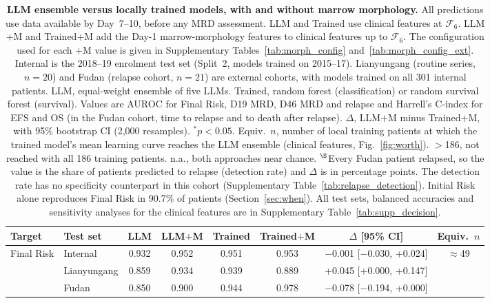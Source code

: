 \documentclass[pdflatex,sn-nature]{sn-jnl}
\begin{document}
\begin{table}[t]
\caption{\textbf{LLM ensemble versus locally trained models,
with and without marrow morphology.}
All predictions use data available by Day~7--10, before any MRD
assessment.
LLM and Trained use clinical features at $\mathcal{F}_6$.
LLM$+$M and Trained$+$M add the Day-1 marrow-morphology features to
clinical features up to $\mathcal{F}_6$.
The configuration used for each $+$M value is given in Supplementary
Tables~\ref{tab:morph_config} and~\ref{tab:morph_config_ext}.
Internal is the 2018--19 enrolment test set (Split~2, models trained on
2015--17).
Lianyungang (routine series, $n=20$) and Fudan (relapse cohort, $n=21$)
are external cohorts, with models trained on all 301 internal patients.
LLM, equal-weight ensemble of five LLMs.
Trained, random forest (classification) or random survival forest
(survival).
Values are AUROC for Final Risk, D19 MRD, D46 MRD and relapse and
Harrell's C-index for EFS and OS (in the Fudan cohort, time to relapse
and to death after relapse).
$\Delta$, LLM$+$M minus Trained$+$M, with 95\% bootstrap CI (2,000
resamples). $^{*}p<0.05$.
Equiv.\ $n$, number of local training patients at which the trained
model's mean learning curve reaches the LLM ensemble (clinical
features, Fig.~\ref{fig:worth}).
$>$186, not reached with all 186 training patients.
n.a., both approaches near chance.
$^{\S}$Every Fudan patient relapsed, so the value is the share of
patients predicted to relapse (detection rate) and $\Delta$ is in
percentage points.
The detection rate has no specificity counterpart in this cohort
(Supplementary Table~\ref{tab:relapse_detection}).
Initial Risk alone reproduces Final Risk in 90.7\% of patients
(Section~\ref{sec:when}).
All test sets, balanced accuracies and sensitivity analyses for the
clinical features are in Supplementary Table~\ref{tab:supp_decision}.}
\label{tab:main}
\centering
\footnotesize
\setlength{\tabcolsep}{2.9pt}
\begin{tabular}{@{}llcccccc@{}}
\toprule
\textbf{Target} & \textbf{Test set} & \textbf{LLM} & \textbf{LLM$+$M} & \textbf{Trained} & \textbf{Trained$+$M} & \textbf{$\Delta$ [95\% CI]} & \textbf{Equiv.\ $n$} \\
\midrule
Final Risk & Internal & 0.932 & 0.952 & 0.951 & 0.953 & $-$0.001 [$-$0.030, +0.024] & $\approx$49 \\
 & Lianyungang & 0.859 & 0.934 & 0.939 & 0.889 & +0.045 [+0.000, +0.147] & \\
 & Fudan & 0.850 & 0.900 & 0.944 & 0.978 & $-$0.078 [$-$0.194, +0.000] & \\

\end{tabular}
\end{table}
\end{document}
